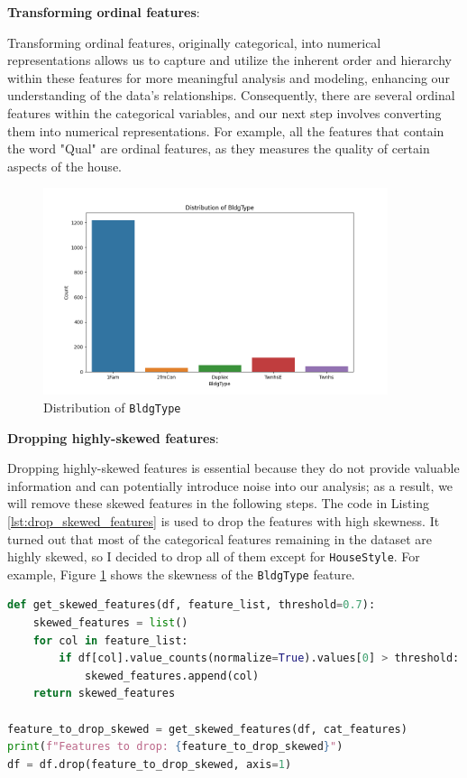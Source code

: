 \documentclass[10pt]{article}
\begin{document}
\textbf{Transforming ordinal features}:

Transforming ordinal features, originally categorical, into numerical representations allows us to capture and utilize the inherent order and hierarchy within these features for more meaningful analysis and modeling, enhancing our understanding of the data's relationships. Consequently, there are several ordinal features within the categorical variables, and our next step involves converting them into numerical representations. For example, all the features that contain the word "Qual" are ordinal features, as they measures the quality of certain aspects of the house. 

\begin{figure}[!htbp]
    \centering
    \includegraphics[width=0.9\textwidth]{../hw1/img/Part_I/BldgType.png}
    \caption{Distribution of \texttt{BldgType}}
    \label{fig:bldgtype}
\end{figure}

\textbf{Dropping highly-skewed features}:

Dropping highly-skewed features is essential because they do not provide valuable information and can potentially introduce noise into our analysis; as a result, we will remove these skewed features in the following steps. The code in Listing \ref{lst:drop_skewed_features} is used to drop the features with high skewness. It turned out that most of the categorical features remaining in the dataset are highly skewed, so I decided to drop all of them except for \texttt{HouseStyle}. For example, Figure \ref{fig:bldgtype} shows the skewness of the \texttt{BldgType} feature.

\begin{lstlisting}[language=Python, label={lst:drop_skewed_features}, caption={Drop the features with high skewness}]
def get_skewed_features(df, feature_list, threshold=0.7):
    skewed_features = list()
    for col in feature_list:
        if df[col].value_counts(normalize=True).values[0] > threshold:
            skewed_features.append(col)
    return skewed_features

feature_to_drop_skewed = get_skewed_features(df, cat_features)
print(f"Features to drop: {feature_to_drop_skewed}")
df = df.drop(feature_to_drop_skewed, axis=1)
\end{lstlisting}
\end{document}
